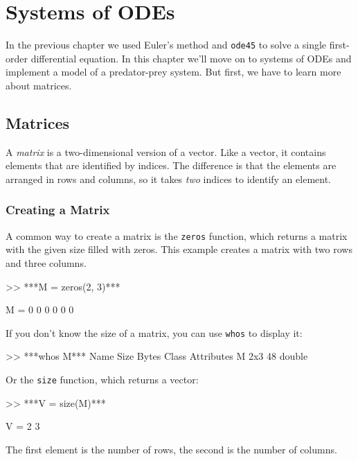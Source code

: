 \chapter{Systems of ODEs}
\label{systems}

In the previous chapter we used Euler's method and {\tt ode45} to solve a single first-order differential equation.  In this chapter we'll move on to systems of ODEs and implement a model of a predator-prey system.  But first, we have to learn more about matrices.


\section{Matrices}

A \emph{matrix} is a two-dimensional version of a vector.  Like a vector,
it contains elements that are identified by indices.  The difference
is that the elements are arranged in rows and columns, so it takes
{\em two} indices to identify an element.

\subsection{Creating a Matrix}


A common way to create a matrix is the \lstinline{zeros} function,
which returns a matrix with the given size filled with zeros.
This example creates a matrix with two rows and three columns.

\begin{code}
>> ***M = zeros(2, 3)***

M =  0     0     0
     0     0     0
\end{code}

If you don't know the size of a matrix, you can use \lstinline{whos} to display it:

\begin{code}
>> ***whos M***
  Name      Size            Bytes  Class     Attributes
  M         2x3                48  double   
\end{code}

Or the \lstinline{size} function, which returns a vector:


\begin{code}
>> ***V = size(M)***

V = 2    3
\end{code}
The first element is the number of rows, the second is the number of
columns.

